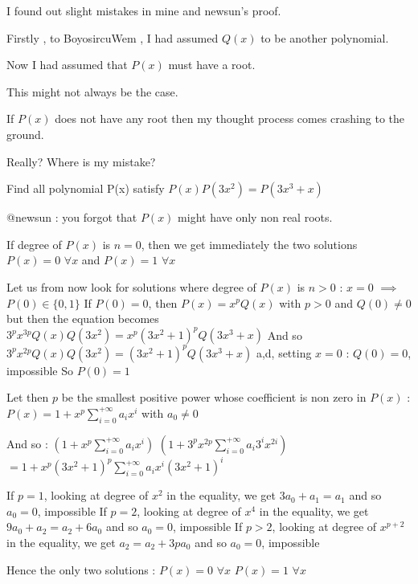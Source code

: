 \begin{solution}
	I found out slight mistakes in mine and newsun's proof.

Firstly , to BoyosircuWem , I had assumed $Q(x)$ to be another polynomial.

Now I had assumed that $P(x)$ must have a root.

This might not always be the case.

If $P(x)$ does not have any root then my thought process comes crashing to the ground.
\end{solution}



\begin{solution}
	Really? Where is my mistake?
\end{solution}



\begin{solution}
	\begin{tcolorbox}Find all polynomial P(x) satisfy $P(x)P(3x^2)=P(3x^3+x)$\end{tcolorbox}
@newsun : you forgot that $P(x)$ might have only non real roots.

If degree of $P(x)$ is $n=0$, then we get immediately the two solutions $P(x)=0$ $\forall x$ and $P(x)=1$ $\forall x$

Let us from now look for solutions where degree of $P(x)$ is $n>0$ :
$x=0$ $\implies$ $P(0)\in\{0,1\}$
If $P(0)=0$, then $P(x)=x^pQ(x)$ with $p>0$ and $Q(0)\ne 0$ but then the equation becomes $3^px^{3p}Q(x)Q(3x^2)=x^p(3x^2+1)^pQ(3x^3+x)$
And so $3^px^{2p}Q(x)Q(3x^2)=(3x^2+1)^pQ(3x^3+x)$ a,d, setting $x=0$ : $Q(0)=0$, impossible
So $P(0)=1$

Let then $p$ be the smallest positive power whose coefficient is non zero in $P(x)$ : $P(x)=1+x^p\sum_{i=0}^{+\infty}a_ix^i$ with $a_0\ne 0$

And so :
$\left(1+x^p\sum_{i=0}^{+\infty}a_ix^i\right)$ $\left(1+3^px^{2p}\sum_{i=0}^{+\infty}a_i3^ix^{2i}\right)$ $=1+x^p(3x^2+1)^p\sum_{i=0}^{+\infty}a_ix^i(3x^2+1)^i$

If $p=1$, looking at degree of $x^2$ in the equality, we get $3a_0+a_1=a_1$ and so $a_0=0$, impossible
If $p=2$, looking at degree of $x^4$ in the equality, we get $9a_0+a_2=a_2+6a_0$ and so $a_0=0$, impossible
If $p>2$, looking at degree of $x^{p+2}$ in the equality, we get $a_2=a_2+3pa_0$ and so $a_0=0$, impossible

Hence the only two solutions :
$P(x)=0$ $\forall x$
$P(x)=1$ $\forall x$
\end{solution}



